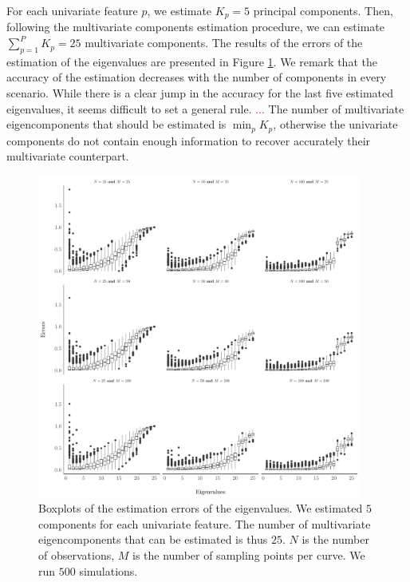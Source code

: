 For each univariate feature $p$, we estimate $K_p = 5$ principal components. Then, following the multivariate components estimation procedure, we can estimate $\sum_{p = 1}^P K_p = 25$ multivariate components. The results of the errors of the estimation of the eigenvalues are presented in Figure \ref{fig:ncomp}. We remark that the accuracy of the estimation decreases with the number of components in every scenario. While there is a clear jump in the accuracy for the last five estimated eigenvalues, it seems difficult to set a general rule. \textcolor{red}{...} The number of multivariate eigencomponents that should be estimated is $\min_p K_p$, otherwise the univariate components do not contain enough information to recover accurately their multivariate counterpart.
\begin{figure}
     \centering
    \includegraphics[width=0.95\textwidth]{figures/ncomp.pdf}
    \caption{Boxplots of the estimation errors of the eigenvalues. We estimated $5$ components for each univariate feature. The number of multivariate eigencomponents that can be estimated is thus $25$. $N$ is the number of observations, $M$ is the number of sampling points per curve. We run $500$ simulations.}
    \label{fig:ncomp}
\end{figure}


